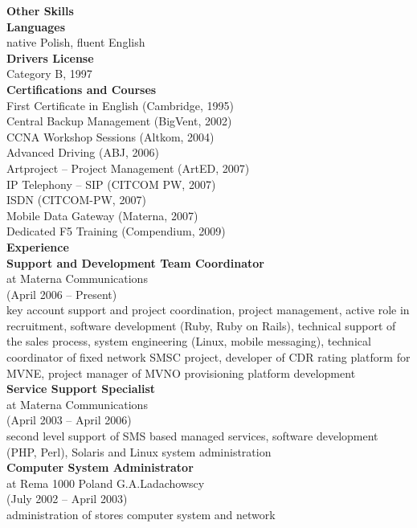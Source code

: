 \documentclass[9pt,a4paper,twocolumn]{extarticle}
\begin{document}
{\bf\Large Other Skills}\\
{\bf Languages}\\
native Polish, fluent English\\
{\bf Drivers License}\\
Category B, 1997\\

{\bf\Large Certifications and Courses}\\

First Certificate in English (Cambridge, 1995)\\
Central Backup Management (BigVent, 2002)\\
CCNA Workshop Sessions (Altkom, 2004)\\
Advanced Driving (ABJ, 2006)\\
Artproject – Project Management (ArtED, 2007)\\
IP Telephony – SIP (CITCOM PW, 2007)\\
ISDN (CITCOM-PW, 2007)\\
Mobile Data Gateway (Materna, 2007)\\
Dedicated F5 Training (Compendium, 2009)\\

{\bf\Large Experience}\\

{\bf Support and Development Team Coordinator}\\
at Materna Communications\\
(April 2006 – Present)\\
key account support and project coordination, project 
management, active role in recruitment, software 
development (Ruby, Ruby on Rails), technical support 
of the sales process, system engineering (Linux, 
mobile messaging), technical coordinator of ﬁxed 
network SMSC project, developer of CDR rating 
platform for MVNE, project manager of MVNO 
provisioning platform development \\

{\bf Service Support Specialist}\\
at Materna Communications \\
(April 2003 – April 2006) \\
second level support of SMS based managed services, software development (PHP, Perl), Solaris and Linux system administration \\

{\bf Computer System Administrator }\\
at Rema 1000 Poland G.A.Ladachowscy \\
(July 2002 – April 2003) \\
administration of stores computer system and network \\
\end{document}
